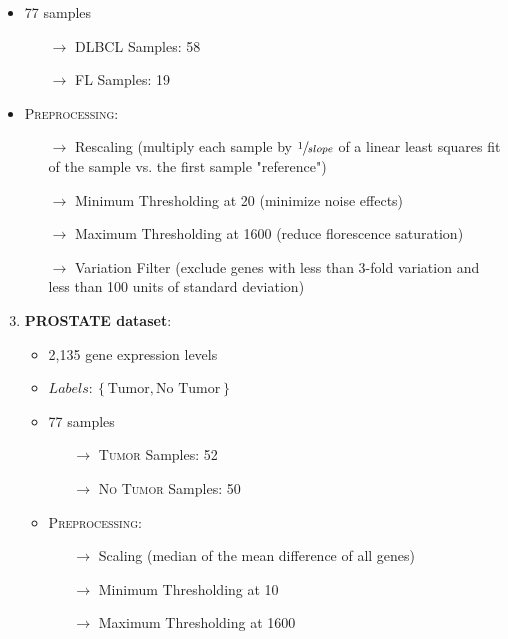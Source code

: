 \documentclass[serif]{beamer}
\begin{document}
\begin{frame}[t]
{\begin{enumerate}
\begin{itemize}
					\item 77 samples
					\begin{itemize}
						\item[$\rightarrow$] \textsc{DLBCL} Samples: 58
						\item[$\rightarrow$] \textsc{FL} Samples: 19
					\end{itemize}
					\item  \textsc{Preprocessing:}
					\begin{itemize}
						\item[$\rightarrow$]  Rescaling (multiply each sample by $\sfrac{1}{slope}$ of
						a linear least squares fit of the sample vs. the first sample "reference")
						\item[$\rightarrow$]  Minimum Thresholding at 20 (minimize noise effects)
						\item[$\rightarrow$]  Maximum Thresholding at 1600 (reduce florescence saturation)
						\item[$\rightarrow$]  Variation Filter (exclude genes with less than 3-fold variation and less than 100 units of standard deviation)
					\end{itemize}
				\end{itemize}
		\end{enumerate}
		}
		{
		\begin{enumerate}
			\setcounter{enumi}{2}
			\item {\bf PROSTATE dataset}:
				\begin{itemize}
					\item 2,135 gene expression levels
					\item  $ Labels: \left \{ \text{Tumor}, \text{No Tumor}  \right \}$
					\item  77 samples
					\begin{itemize}
						\item[$\rightarrow$]  \textsc{Tumor} Samples: 52
						\item[$\rightarrow$]  \textsc{No Tumor} Samples: 50
					\end{itemize}					
					\item  \textsc{Preprocessing:}
					\begin{itemize}
						\item[$\rightarrow$]  Scaling (median of the mean difference of all genes)
						\item[$\rightarrow$]  Minimum Thresholding at 10
						\item[$\rightarrow$]  Maximum Thresholding at 1600
					\end{itemize}
				\end{itemize}
		\end{enumerate}
		}
	\end{frame}
\end{document}
